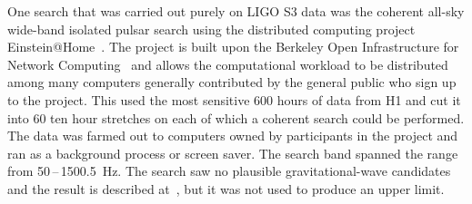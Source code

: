 One search that was carried out purely on LIGO S3 data was the coherent all-sky
wide-band isolated pulsar search using the distributed computing project
Einstein@Home~\cite{eath}. The project is built upon the Berkeley Open
Infrastructure for Network Computing~\cite{BOINC} and allows the computational
workload to be distributed among many computers generally contributed by the
general public who sign up to the project. This used the most sensitive 600
hours of data from H1 and cut it into 60 ten hour stretches on each of which
a coherent search could be performed. The data was farmed out to computers owned
by participants in the project and ran as a background process or screen saver.
The search band spanned the range from 50\,--\,1500.5~Hz. The search saw no
plausible gravitational-wave candidates and the result is described
at~\cite{eathS3}, but it was not used to produce an upper limit.


